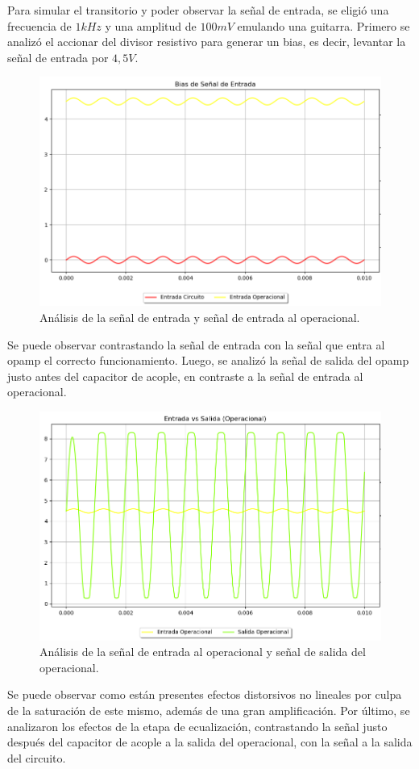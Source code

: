 Para simular el transitorio y poder observar la señal de entrada, se eligió una frecuencia de $1kHz$ y una amplitud de $100mV$ emulando una guitarra.
Primero se analizó el accionar del divisor resistivo para generar un bias, es decir, levantar la señal de entrada por $4,5V$.
\begin{figure}[H]
	\centering
	\includegraphics[width=1\textwidth, trim={0 0 0 0}, clip]{Ejercicio5/Imagenes/Circuito_base/Sim/circuito_base_tran_vi_viop.png}
	\caption{Análisis de la señal de entrada y señal de entrada al operacional.}
	\label{fig:sim_base}
\end{figure}
Se puede observar contrastando la señal de entrada con la señal que entra al opamp el correcto funcionamiento.
Luego, se analizó la señal de salida del opamp justo antes del capacitor de acople, en contraste a la señal de entrada al operacional.
\begin{figure}[H]
	\centering
	\includegraphics[width=1\textwidth, trim={0 0 0 0}, clip]{Ejercicio5/Imagenes/Circuito_base/Sim/circuito_base_tran_viop_voop.png}
	\caption{Análisis de la señal de entrada al operacional y señal de salida del operacional. }
	\label{fig:sim_base}
\end{figure}
Se puede observar como están presentes efectos distorsivos no lineales por culpa de la saturación de este mismo, además de una gran amplificación.
Por último, se analizaron los efectos de la etapa de ecualización, contrastando la señal justo después del capacitor de acople a la salida del operacional, con la señal a la salida del circuito.

